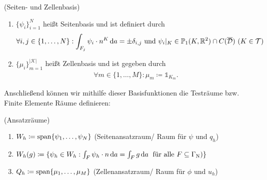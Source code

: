  \begin{Definition}(Seiten- und Zellenbasis) 
	\begin{enumerate}[label=(\alph*)]
		\item $ \{ \psi_i \}_{i=1}^{N} $ heißt Seitenbasis und ist definiert durch
			\begin{align*}
					\forall i,j \in \{1, \dots , N \} : \int_{F_j} \psi_i \cdot n^K \, \mathrm{d} a = \pm \delta_{i,j} \text{ und }  \psi_i|_K \in \mathbb{P}_1(K,\mathbb{R}^2) \cap C(\overline{\mathcal{D}}) \ (K \in \mathcal{T}) 
			\end{align*} 
		\item $ \{ \mu_i \}_{m=1}^{|\mathcal{K}|} $ heißt Zellenbasis und ist gegeben durch
			\begin{align*}
				\forall m \in \{1, \dots , M \} : \mu_m \coloneqq  \mathds{1}_{K_m}.
			\end{align*}
	\end{enumerate}
\end{Definition} 

Anschließend können wir mithilfe dieser Basisfunktionen die Testräume bzw. Finite Elemente Räume definieren:
\begin{Definition}(Ansatzräume)
	\begin{enumerate}[label=(\alph*)]
		\item $ W_h \coloneqq \operatorname{span} \{ \psi_1,\dots,\psi_{N}\}$ (Seitenansatzraum/ Raum für $ \psi $ und $ q_h $)
		\item $ W_h(g) \coloneqq \{ \psi_h \in W_h:  \int_F \psi_h \cdot n \, \mathrm{d} a = \int_F g \, \mathrm{d} a \; \text{ für alle } F \subseteq \Gamma_{\text{N}})  \}$
		\item $ Q_h \coloneqq \operatorname{span} \{ \mu_1, \dots, \mu_{M} \} $ (Zellenansatzraum/ Raum für $\phi $ und $ u_h $)
	\end{enumerate}
\end{Definition}

%	

